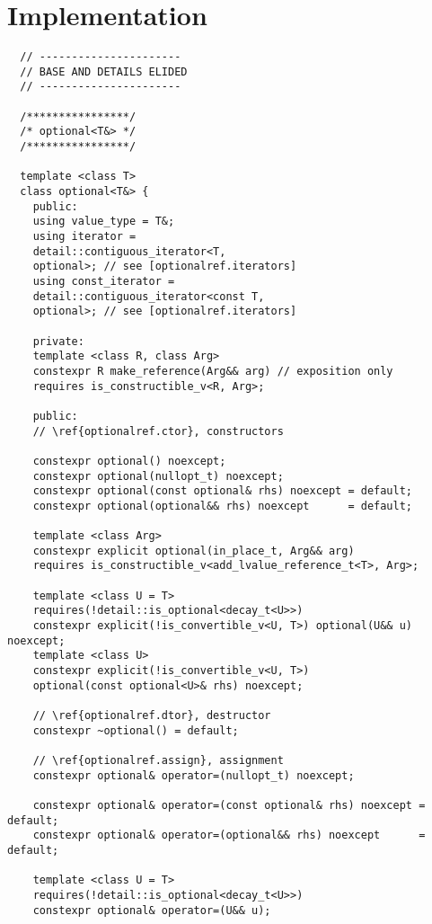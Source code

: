 \documentclass[a4paper,10pt,oneside,openany,final,article]{memoir}
\begin{document}
\renewcommand{\bibname}{References}




\backmatter
\chapter*{Implementation}

\begin{verbatim}
  // ----------------------
  // BASE AND DETAILS ELIDED
  // ----------------------

  /****************/
  /* optional<T&> */
  /****************/

  template <class T>
  class optional<T&> {
    public:
    using value_type = T&;
    using iterator =
    detail::contiguous_iterator<T,
    optional>; // see [optionalref.iterators]
    using const_iterator =
    detail::contiguous_iterator<const T,
    optional>; // see [optionalref.iterators]

    private:
    template <class R, class Arg>
    constexpr R make_reference(Arg&& arg) // exposition only
    requires is_constructible_v<R, Arg>;

    public:
    // \ref{optionalref.ctor}, constructors

    constexpr optional() noexcept;
    constexpr optional(nullopt_t) noexcept;
    constexpr optional(const optional& rhs) noexcept = default;
    constexpr optional(optional&& rhs) noexcept      = default;

    template <class Arg>
    constexpr explicit optional(in_place_t, Arg&& arg)
    requires is_constructible_v<add_lvalue_reference_t<T>, Arg>;

    template <class U = T>
    requires(!detail::is_optional<decay_t<U>>)
    constexpr explicit(!is_convertible_v<U, T>) optional(U&& u) noexcept;
    template <class U>
    constexpr explicit(!is_convertible_v<U, T>)
    optional(const optional<U>& rhs) noexcept;

    // \ref{optionalref.dtor}, destructor
    constexpr ~optional() = default;

    // \ref{optionalref.assign}, assignment
    constexpr optional& operator=(nullopt_t) noexcept;

    constexpr optional& operator=(const optional& rhs) noexcept = default;
    constexpr optional& operator=(optional&& rhs) noexcept      = default;

    template <class U = T>
    requires(!detail::is_optional<decay_t<U>>)
    constexpr optional& operator=(U&& u);


\end{verbatim}
\end{document}
